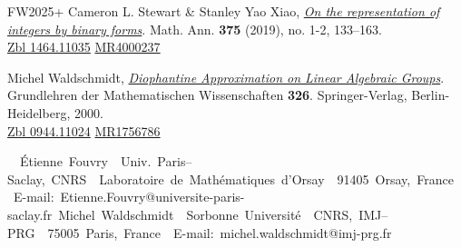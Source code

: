 \documentclass[10pt]{article}
\theoremstyle{definition}
\numberwithin{equation}{section}
\begin{document}
\begin{thebibliography}{FW2025+}
  Cameron L. Stewart \& Stanley Yao Xiao, 
 \href{https://doi.org/10.1007/s00208-019-01855-y}{\em On the representation of integers by binary forms}. Math. Ann. {\bf 375} (2019), no. 1-2, 133--163.
 \\
 \href{http://msp.org/idx/zbl/1464.11035}{Zbl 1464.11035}\qquad
 \href{https://mathscinet.ams.org/mathscinet/relay-station?mr=4000237}{MR4000237}
 
 Michel Waldschmidt,
\href{https://link.springer.com/book/10.1007/978-3-662-11569-5}{\em Diophantine Approximation on Linear Algebraic Groups}.
Grundlehren der Mathematischen Wissenschaften {\bf 326}.
Springer-Verlag, Berlin-Heidelberg, 2000. 
\\
 \href{http://msp.org/idx/zbl/0944.11024}{Zbl 0944.11024}
 \qquad
 \href{https://mathscinet.ams.org/mathscinet/relay-station?mr=1756786}{MR1756786}
 
 \end{thebibliography}
 
 \vfill
 
\hbox{ 
 \vbox{ 
 \hbox{
\'Etienne Fouvry\\
}
 \hbox{
Univ. Paris--Saclay, CNRS \\
}
 \hbox{
Laboratoire de Math\' ematiques d'Orsay \\
}
 \hbox{
91405 Orsay, France \\
}
 \hbox{
E-mail: Etienne.Fouvry@universite-paris-saclay.fr}
}
\hfill 
 \vbox{
 \hbox{Michel Waldschmidt\\
}
 \hbox{
Sorbonne Universit\' e \\
}
 \hbox{
CNRS, IMJ--PRG \\
}
 \hbox{
75005 Paris, France\\
}
 \hbox{
E-mail: michel.waldschmidt@imj-prg.fr
}
}
}

 \vfill

 \vfill

 \vfill

 
\end{document}
